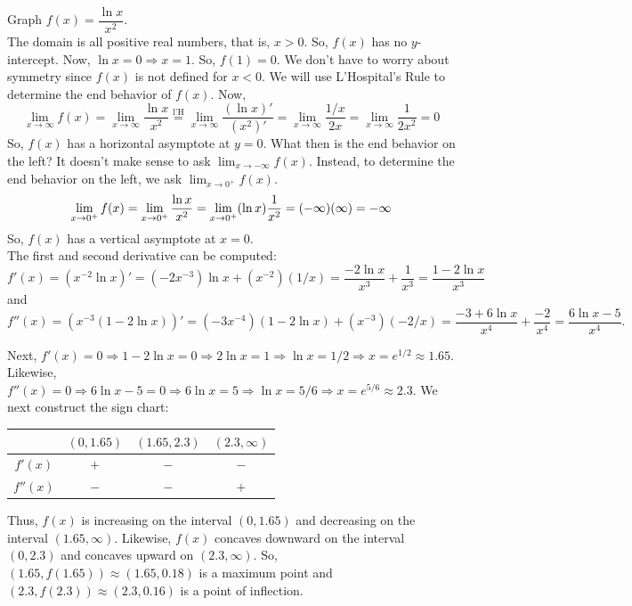 \documentclass{book}
\newcommand{\lHeq}{\overset{\text{l'H}}{=}}
\begin{document}
\begin{Exam} Graph $f(x) = \dfrac{\ln x}{x^2}$.\\

The domain is all positive real numbers, that is, $x > 0$. So, $f(x)$ has no $y$-intercept. Now, $\ln x = 0 \Rightarrow x= 1$. So, $f(1) = 0$. We don't have to worry about symmetry since $f(x)$ is not defined for $x < 0$. We will use L'Hospital's Rule to determine the end behavior of $f(x)$. Now, 
\[\lim_{x\to \infty} f(x) = \lim_{x\to \infty} \dfrac{\ln x}{x^2} \lHeq  \lim_{x\to \infty} \dfrac{(\ln x)'}{(x^2)'} = \lim_{x\to \infty}\dfrac{1/x}{2x} = \lim_{x\to \infty} \dfrac{1}{2x^2} =  0\]  So, $f(x)$ has a horizontal asymptote at $y = 0$. What then is the end behavior on the left? It doesn't make sense to ask $\displaystyle\lim_{x\to -\infty} f(x)$. Instead, to determine the end behavior on the left, we ask $ \displaystyle\lim_{x\to 0^+} f(x)$.
\[\lim_{x\to 0^+} f(x) = \lim_{x\to 0^+} \dfrac{\ln x}{x^2} = \lim_{x\to 0^+} (\ln x)\dfrac{1}{x^2} = (-\infty)(\infty)\\
= -\infty\] So, $f(x)$ has a vertical asymptote at $x =0$. \\

The first and second derivative can be computed: \[f'(x) = (x^{-2}\ln x)' = (-2x^{-3})\ln x + (x^{-2})(1/x) = \dfrac{-2\ln x}{x^3} + \dfrac{1}{x^3} = \dfrac{1-2\ln x}{x^3}\] and \[f''(x) = (x^{-3}(1-2\ln x))' = (-3x^{-4})(1-2\ln x) + (x^{-3})(-2/x) = \dfrac{-3+6\ln x}{x^4} + \dfrac{-2}{x^4} = \dfrac{ 6\ln x - 5}{x^4}.\] 

Next, $f'(x) = 0 \Rightarrow 1-2\ln x = 0 \Rightarrow 2\ln x = 1 \Rightarrow \ln x = 1/2 \Rightarrow x = e^{1/2} \approx 1.65$. Likewise, $f''(x) = 0 \Rightarrow 6\ln x - 5= 0 \Rightarrow 6\ln x = 5 \Rightarrow \ln x = 5/6 \Rightarrow x = e^{5/6} \approx 2.3$. We next construct the sign chart:

\begin{center}
\begin{tabular}{c|c|c|c}
 & $(0, 1.65)$ & $(1.65, 2.3)$ & $(2.3, \infty)$ \\ \hline
$f'(x)$ & $+$ & $-$ & $-$ \\ 
$f''(x)$ & $-$ & $-$ & $+$ \\ 
\end{tabular}
\end{center} Thus, $f(x)$ is increasing on the interval $(0, 1.65)$ and decreasing on the interval $(1.65, \infty)$. Likewise, $f(x)$ concaves downward on the interval $(0, 2.3)$ and concaves upward on $(2.3, \infty)$. So, $(1.65, f(1.65)) \approx (1.65, 0.18)$ is a maximum point and $(2.3, f(2.3)) \approx (2.3, 0.16)$ is a point of inflection.\\


\end{Exam}
\end{document}
